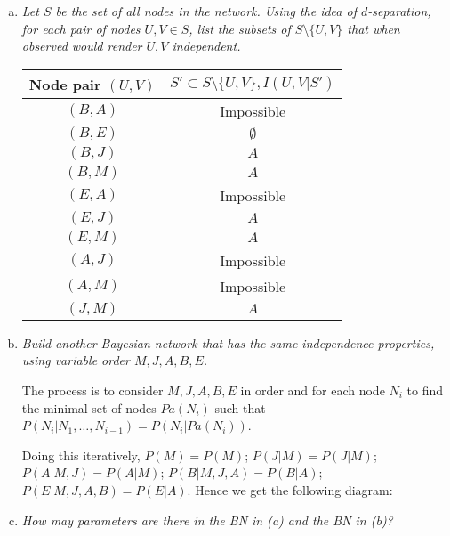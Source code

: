 \documentclass{article}
\begin{document}
\begin{enumerate}[(a)]
\item \textit{Let $S$ be the set of all nodes in the network. Using
  the idea of $d$-separation, for each pair of nodes $U,V\in S$, list
  the subsets of $S\setminus \{U,V\}$ that when observed would render
  $U,V$ independent.}

  \begin{tabular}{|c|c|}
  \hline
  Node pair $(U,V)$ & $S'\subset S\setminus \{U,V\},I(U,V|S')$ \\
  \hline
  $(B, A)$ & Impossible \\
  $(B, E)$ & $\emptyset$ \\
  $(B, J)$ & $A$ \\
  $(B, M)$ & $A$ \\
  $(E, A)$ & Impossible \\
  $(E, J)$ & $A$ \\
  $(E, M)$ & $A$ \\
  $(A, J)$ & Impossible \\
  $(A, M)$ & Impossible \\
  $(J, M)$ & $A$ \\
  \hline
  \end{tabular}

\item \textit{Build another Bayesian network that has the same
  independence properties, using variable order $M,J,A,B,E$.}

  The process is to consider $M,J,A,B,E$ in order and for each node
  $N_i$ to find the minimal set of nodes $Pa(N_i)$ such that
  $P(N_i|N_1,\ldots,N_{i-1})=P(N_i|Pa(N_i))$.

  Doing this iteratively, $P(M)=P(M)$; $P(J|M)=P(J|M)$;
  $P(A|M,J)=P(A|M)$; $P(B|M,J,A)=P(B|A)$; $P(E|M,J,A,B)=P(E|A)$. Hence
  we get the following diagram:

\begin{center}
\end{center}
\item \textit{How may parameters are there in the BN in (a) and the BN in (b)?}


\end{enumerate}
\end{document}
